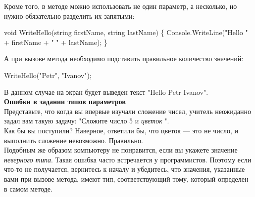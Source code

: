 \documentclass[12pt, a4paper]{article}
\begin{document}
Кроме того, в методе можно использовать не один параметр, а несколько, но нужно обязательно разделить их запятыми:\\

\begin{spverbatim}void WriteHello(string firstName, string lastName)
\{
    Console.WriteLine("Hello " + firstName + " " + lastName);
\}\end{spverbatim}

А при вызове метода необходимо подставить правильное количество значений:\\

\begin{spverbatim}WriteHello("Petr", "Ivanov");\end{spverbatim}

В данном случае на экран будет выведен текст "Hello Petr Ivanov".\\



\textbf{Ошибки в задании типов параметров}\\

Представьте, что когда вы впервые изучали сложение чисел, учитель неожиданно задал вам такую задачу: "Сложите число 5 и \textit{цветок} ".\\

Как бы вы поступили? Наверное, ответили бы, что цветок — это не число, и выполнить сложение невозможно. Правильно.\\

Подобным же образом компьютеру не понравится, если вы укажете значение \textit{неверного типа}. Такая ошибка часто встречается у программистов. Поэтому если что-то не получается, вернитесь к началу и убедитесь, что значения, указанные вами при вызове метода, имеют тип, соответствующий тому, который определен в самом методе.\\
\end{document}
